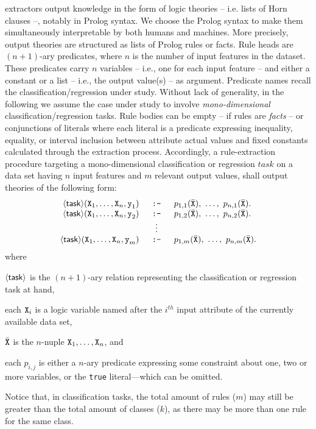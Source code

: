 \documentclass[12pt,a4paper,openright,twoside]{book}
\begin{document}
\psyke{} extractors output knowledge in the form of logic theories -- i.e. lists of Horn clauses --, notably in Prolog syntax.
%
We choose the Prolog syntax to make them simultaneously interpretable by both humans and machines.
%
More precisely, \psyke{} output theories are structured as lists of Prolog rules or facts.
%
Rule heads are $(n+1)$-ary predicates, where $n$ is the number of input features in the dataset.
%
These predicates carry $n$ variables -- i.e., one for each input feature -- and either a constant or a list -- i.e., the output value(s) -- as argument.
%
Predicate names recall the classification/regression under study.
%
Without lack of generality, in the following we assume the case under study to involve \emph{mono-dimensional} classification/regression tasks.
%
Rule bodies can be empty -- if rules are \emph{facts} -- or conjunctions of literals where each literal is a predicate expressing inequality, equality, or interval inclusion between attribute actual values and fixed constants calculated through the extraction process.
%
Accordingly, a rule-extraction procedure targeting a mono-dimensional classification or regression $task$ on a data set having $n$ input features and $m$ relevant output values, shall output theories of the following form:
%
\begin{equation*}
    \begin{array}{rcl}
        \logicrule{\meta{task}(\var{X}_1, \ldots, \var{X}_n, \const{y}_1)}{p_{1,1}(\bar{\var{X}}),\ \ldots,\ p_{n,1}(\bar{\var{X}})}.\\
        \logicrule{\meta{task}(\var{X}_1, \ldots, \var{X}_n, \const{y}_2)}{p_{1,2}(\bar{\var{X}}),\ \ldots,\ p_{n,2}(\bar{\var{X}})}.\\
        & \vdots \\
        \logicrule{\meta{task}(\var{X}_1, \ldots, \var{X}_n, \const{y}_m)}{p_{1,m}(\bar{\var{X}}),\ \ldots,\ p_{n,m}(\bar{\var{X}})}.\\
    \end{array}
\end{equation*}
%
where
%
\begin{inlinelist}
    \item $\mathsf{\left\langle task\right\rangle}$ is the $(n+1)$-ary relation representing the classification or regression task at hand,
    \item each $\texttt{X}_i$ is a logic variable named after the $i^{th}$ input attribute of the currently available data set,
    \item $\bar{\texttt{X}}$ is the $n$-nuple $\texttt{X}_1, \ldots, \texttt{X}_n$, and
    \item each $p_{i,j}$ is either a $n$-ary predicate expressing some constraint about one, two or more variables, or the \texttt{true} literal---which can be omitted.
\end{inlinelist}
%
Notice that, in classification tasks, the total amount of rules ($m$) may still be greater than the total amount of classes ($k$), as there may be more than one rule for the same class. %
\end{document}
